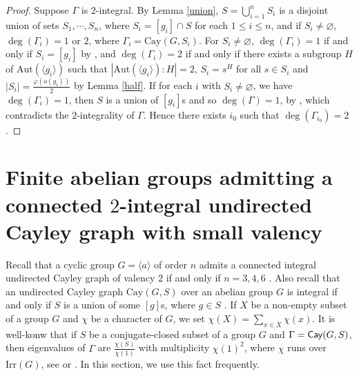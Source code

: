 \documentclass[12pt,a4paper]{article}
\def \leq {\leqslant}
\def\Cay{{\sf Cay}} \def\Ker{{\sf Ker}}
\begin{document}
	\begin{proof}
		Suppose $\Gamma$ is $2$-integral. 
		By Lemma \ref{union}, $S=\bigcup_{i=1}^{n}S_i$ is a disjoint union of sets $S_1,\cdots,S_n$, where $S_i=[g_i]\cap S$ for each $1\leq i\leq n$, and if $S_i\neq \varnothing$, $\deg(\Gamma_i)=1$ or $2$, where $\Gamma_i=\mathrm{Cay}(G,S_i)$. 
		For $S_i\neq \varnothing$, $\deg(\Gamma_i)=1$ if and only if $S_i=[g_i]$ by \cite[Corollary 7.2]{AP}, and $\deg(\Gamma_i)=2$ if and only if  there exists
		a subgroup $H$ of $\mathrm{Aut}(\langle g_i\rangle)$ such that $|\mathrm{Aut}(\langle g_i\rangle):H|=2$, $S_i=s^H$ for all $s\in S_i$ and $|S_i|=\frac{\varphi(o(g_i))}{2}$ by Lemma \ref{half}. 
		If for each $i$ with $S_i\neq \varnothing$, we have	$\deg(\Gamma_i)=1$, then $S$ is a union of $[g_i]$s and so $\deg(\Gamma)=1$, by \cite[Proposition 4.1]{AP}, which contradicts  the $2$-integrality of $\Gamma$. 
		Hence there exists $i_0$ such
		that $\deg(\Gamma_{i_0})=2$. 
	\end{proof}
	
	
	
	\section{Finite abelian groups admitting a connected $2$-integral undirected Cayley graph with  small valency}
	Recall that a cyclic group $G=\langle a\rangle$ of order $n$ admits a connected integral undirected Cayley graph of valency $2$ if and only if $n=3,4,6$ \cite[Lemma 2.7]{AV}. Also recall that an undirected Cayley graph $\mathrm{Cay}(G,S)$ over
	an abelian group $G$ is integral if and only if $S$ is a union of some $[g]$s, where $g\in S$ \cite{Alprin,AP}.  If $X$ be a non-empty subset of a group $G$ and $\chi$ be a character of $G$, we set $\chi(X)=\sum_{x\in X}\chi(x)$. It is well-konw that if $S$ be a conjugate-closed subset of a group $G$ and $\Gamma=\Cay(G,S)$, then eigenvalues of $\Gamma$ are $\frac{\chi(S)}{\chi(1)}$ with multiplicity $\chi(1)^2$, where $\chi$ runs over $\mathrm{Irr}(G)$,  see \cite[Theorem 1]{Z} or \cite{Ito}. In this section, we use this fact frequently.
	
\end{document}
